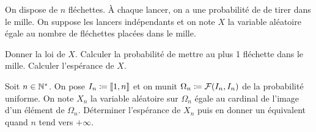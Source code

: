 \documentclass{magnolia}
\begin{document}
\begin{exos}
\exo On dispose de $n$ fléchettes. À chaque lancer, on a une probabilité de  de
  tirer dans le mille. On suppose les lancers indépendants et on note $X$ la variable aléatoire
  égale au nombre de fléchettes placées dans le mille.
\begin{questions}
\question Donner la loi de $X$.
\question Calculer la probabilité de mettre au plus 1 fléchette dans le mille.
\question Calculer l'espérance de $X$.
\end{questions}
\exo Soit $n\in{\mathbb{N}^*}$. On pose $I_n\coloneqq\left\llbracket 1,n\right\rrbracket$ et on munit
  $\Omega_n\coloneqq\mathcal{F}(I_n,I_n)$ de la
  probabilité uniforme. On note $X_n$ la variable aléatoire sur $\Omega_n$ égale au cardinal de
  l'image d'un élément de $\Omega_n$. Déterminer l'espérance de $X_n$ puis en donner un équivalent quand
  $n$ tend vers $+\infty$.
\end{exos}
\end{document}
